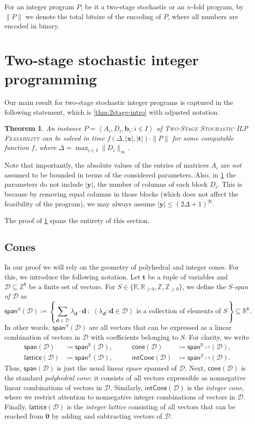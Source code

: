 \documentclass{article}
\newtheorem{theorem}{Theorem}\newtheorem{lemma}[theorem]{Lemma}\newtheorem{proposition}[theorem]{Proposition}\newtheorem{corollary}[theorem]{Corollary}\newtheorem{definition}[theorem]{Definition}\newtheorem{claim}[theorem]{Claim}\newtheorem{remark}[theorem]{Remark}\newtheorem{observation}[theorem]{Observation}\newtheorem{conjecture}[theorem]{Conjecture}\newtheorem{example}[theorem]{Example}
\renewcommand{\leq}{\leqslant}
\renewcommand{\geq}{\geqslant}
\newcommand{\Dd}{\mathcal{D}}
\newcommand{\Z}{\mathbb{Z}}
\newcommand{\Zn}{\Z_{\geq 0}}
\newcommand{\R}{\mathbb{R}}
\newcommand{\myRn}{\R_{\geq 0}} %
\newcommand{\tup}[1]{{\mathbf{#1}}}
\newcommand{\xx}{\tup x}
\newcommand{\yy}{\tup y}
\newcommand{\tv}{\tup t}
\newcommand{\bb}{\tup b}
\newcommand{\dd}{\tup d}
\newcommand{\zero}{\tup 0}
\newcommand{\mset}[1]{\left\langle #1\right\rangle}
\newcommand{\stageFeas}{\textsc{Two-Stage Stochastic ILP Feasability}}
\newcommand{\nfold}{$n$-fold}
\newcommand{\stage}{two-stage stochastic}
\newcommand{\realcone}{\mathsf{cone}}
\newcommand{\intcone}{\mathsf{intCone}}
\newcommand{\lattice}{\mathsf{lattice}}
\newcommand{\spn}{\mathsf{span}}
\begin{document}
\medskip

For an integer program $P$, be it a \stage{} or an \nfold{} program, by $\|P\|$ we denote the total bitsize of the encoding of $P$, where all numbers are encoded in binary.
\section{Two-stage stochastic integer programming}

Our main result for \stage{} integer programs is captured in the following statement, which is \cref{thm:2stage-intro} with adjusted notation.


\begin{theorem}\label{thm:2stage-main}
An instance $P=\mset{A_i,D_i,\bb_i\colon i\in I}$ of \stageFeas{} can be solved in time $f(\Delta,|\xx|,|\tv|)\cdot \|P\|$ for some computable function $f$, where $\Delta=\max_{i\in I} \|D_i\|_\infty$.
\end{theorem}


Note that importantly, the absolute values of the entries of matrices $A_i$ are {\em{not}} assumed to be bounded in terms of the considered parameters. Also, in \cref{thm:2stage-main} the parameters do not include $|\yy|$, the  number of columns of each block $D_i$. This is because by removing equal columns in those blocks (which does not affect the feasibility of the program), we may always assume $|\yy|\leq (2\Delta+1)^{|\tv|}$.

The proof of \cref{thm:2stage-main} spans the entirety of this section.

\subsection{Cones}

In our proof we will rely on the geometry of polyhedral and integer cones. For this, we introduce the following notation. Let $\tv$ be a tuple of variables and $\Dd\subseteq \Z^\tv$ be a finite set of vectors.
For $S\in \{\R,\myRn,\Z,\Zn\}$, we define the {\em{$S$-span of $\Dd$}} as
$$\spn^S(\Dd)\coloneqq \left\{\sum_{\dd\in \Dd} \lambda_\dd\cdot  \dd~\colon~\mset{\lambda_\dd\colon \dd\in \Dd} \textrm{ is a collection of elements of }S\right\}\subseteq \R^{\tv}.$$
In other words, $\spn^S(\Dd)$ are all vectors that can be expressed as a linear combination of vectors in $\Dd$ with coefficients belonging to $S$.
For clarity, we write
\begin{align*}
\spn(\Dd)&\coloneqq \spn^{\R}(\Dd), &\qquad \realcone(\Dd)&\coloneqq \spn^{\myRn}(\Dd),\\
\lattice(\Dd)&\coloneqq \spn^{\Z}(\Dd), &\qquad \intcone(\Dd)&\coloneqq \spn^{\Zn}(\Dd).
\end{align*}
Thus, $\spn(\Dd)$ is just the usual linear space spanned of $\Dd$. Next, $\realcone(\Dd)$ is the standard {\em{polyhedral cone}}: it consists of all vectors expressible as nonnegative linear combinations of vectors in $\Dd$. Similarly, $\intcone(\Dd)$ is the {\em{integer cone}}, where we restrict attention to nonnegative integer combinations of vectors in $\Dd$. Finally, $\lattice(\Dd)$ is the {\em{integer lattice}} consisting of all vectors that can be reached from $\zero$ by adding and subtracting vectors of $\Dd$.
\end{document}
